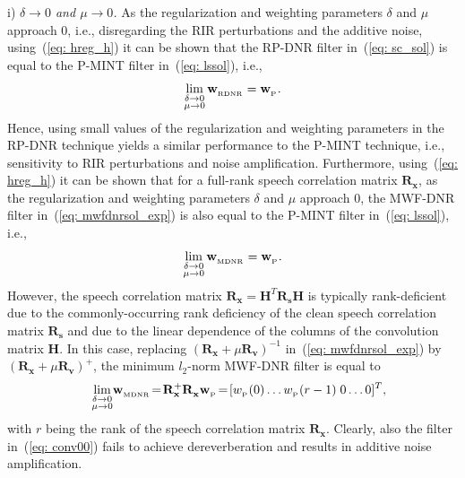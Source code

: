 \documentclass[draftcls,onecolumn,11pt]{IEEEtran}
\begin{document}
i) {\textit{$\delta \rightarrow 0$ and $\mu \rightarrow 0$.}} \enspace As the regularization and weighting parameters $\delta$ and $\mu$ approach $0$, i.e., disregarding the RIR perturbations and the additive noise, using~(\ref{eq: hreg_h}) it can be shown that the RP-DNR filter in~(\ref{eq: sc_sol}) is equal to the P-MINT filter in~(\ref{eq: lssol}), i.e., 
\begin{equation}
\lim_{\substack{\delta \rightarrow 0\\ \mu \rightarrow 0 }} \mathbf{w}_{_{\rm RDNR}} = \mathbf{w}_{_{\rm P}}.
\end{equation}
Hence, using small values of the regularization and weighting parameters in the RP-DNR technique yields a similar performance to the P-MINT technique, i.e., sensitivity to RIR perturbations and noise amplification.
Furthermore, using~(\ref{eq: hreg_h}) it can be shown that for a full-rank speech correlation matrix $\mathbf{R}_{\mathbf{x}}$, as the regularization and weighting parameters $\delta$ and $\mu$ approach $0$, the MWF-DNR filter in~(\ref{eq: mwfdnrsol_exp}) is also equal to the P-MINT filter in~(\ref{eq: lssol}), i.e., 
\begin{equation}
\lim_{\substack{\delta \rightarrow 0\\ \mu \rightarrow 0 }} \mathbf{w}_{_{\rm MDNR}} = \mathbf{w}_{_{\rm P}}.
\end{equation}
However, the speech correlation matrix $\mathbf{R}_{\mathbf{x}} = \mathbf{H}^T\mathbf{R}_{\mathbf{s}}\mathbf{H}$ is typically rank-deficient due to the commonly-occurring rank deficiency of the clean speech correlation matrix $\mathbf{R}_{\mathbf{s}}$ and due to the linear dependence of the columns of the convolution matrix $\mathbf{H}$.
In this case, replacing $(\mathbf{R}_{\mathbf{x}} + \mu \mathbf{R}_{\mathbf{v}})^{-1}$ in~(\ref{eq: mwfdnrsol_exp}) by $(\mathbf{R}_{\mathbf{x}} + \mu \mathbf{R}_{\mathbf{v}})^+$, the minimum $l_2$-norm MWF-DNR filter is equal to
\begin{equation}
\label{eq: conv00}
\hspace{-0.05cm}\lim_{\substack{\delta \rightarrow 0\\ \mu \rightarrow 0 }}\! \mathbf{w}_{_{\rm MDNR}}\! =\! \mathbf{R}_{\mathbf{x}}^+\mathbf{R}_{\mathbf{x}}^{}\mathbf{w}_{_{\rm P}} \!=\! [w_{_{\rm P}}(0) \ldots w_{_{\rm P}}(r-1) \; 0  \ldots 0]^T, \hspace{-0.4cm}
\end{equation}
with $r$ being the rank of the speech correlation matrix $\mathbf{R}_{\mathbf{x}}$.
Clearly, also the filter in~(\ref{eq: conv00}) fails to achieve dereverberation and results in additive noise amplification.
\end{document}
